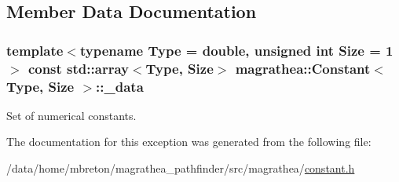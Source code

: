 \subsection{Member Data Documentation}
\hypertarget{exceptionmagrathea_1_1Constant_a00180da842634dbab0822eb25b33ed21}{
\subsubsection[{\-\_\-data}]{\setlength{\rightskip}{0pt plus 5cm}template$<$typename Type = double, unsigned int Size = 1$>$ const std\-::array$<$Type, Size$>$ {\bf magrathea\-::\-Constant}$<$ Type, Size $>$\-::\-\_\-data\hspace{0.3cm}{\ttfamily [protected]}}}\label{exceptionmagrathea_1_1Constant_a00180da842634dbab0822eb25b33ed21}


Set of numerical constants. 



The documentation for this exception was generated from the following file\-:\begin{DoxyCompactItemize}
\item 
/data/home/mbreton/magrathea\-\_\-pathfinder/src/magrathea/\hyperlink{constant_8h}{constant.\-h}\end{DoxyCompactItemize}
